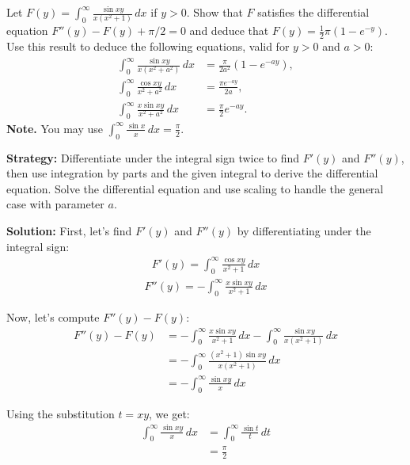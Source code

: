 \begin{problembox}
Let $F(y) = \int_{0}^{\infty} \frac{\sin xy}{x(x^2 + 1)} \, dx$ if $y > 0$. Show that $F$ satisfies the differential equation $F''(y) - F(y) + \pi / 2 = 0$ and deduce that $F(y) = \frac{1}{2} \pi (1 - e^{-y})$. Use this result to deduce the following equations, valid for $y > 0$ and $a > 0$:
\begin{align*}
\int_{0}^{\infty} \frac{\sin xy}{x(x^2 + a^2)} \, dx &= \frac{\pi}{2a^2} (1 - e^{-ay}), \\
\int_{0}^{\infty} \frac{\cos xy}{x^2 + a^2} \, dx &= \frac{\pi e^{-ay}}{2a}, \\
\int_{0}^{\infty} \frac{x \sin xy}{x^2 + a^2} \, dx &= \frac{\pi}{2} e^{-ay}.
\end{align*}
\textbf{Note.} You may use $\int_{0}^{\infty} \frac{\sin x}{x} \, dx = \frac{\pi}{2}.$
\end{problembox}

\noindent\textbf{Strategy:} Differentiate under the integral sign twice to find $F'(y)$ and $F''(y)$, then use integration by parts and the given integral to derive the differential equation. Solve the differential equation and use scaling to handle the general case with parameter $a$.

\bigskip\noindent\textbf{Solution:}
First, let's find $F'(y)$ and $F''(y)$ by differentiating under the integral sign:
\begin{align*}
F'(y) = \int_{0}^{\infty} \frac{\cos xy}{x^2 + 1} \, dx
\end{align*}
\begin{align*}
F''(y) = -\int_{0}^{\infty} \frac{x \sin xy}{x^2 + 1} \, dx
\end{align*}

Now, let's compute $F''(y) - F(y)$:
\begin{align*}
F''(y) - F(y) &= -\int_{0}^{\infty} \frac{x \sin xy}{x^2 + 1} \, dx - \int_{0}^{\infty} \frac{\sin xy}{x(x^2 + 1)} \, dx \\
&= -\int_{0}^{\infty} \frac{(x^2 + 1) \sin xy}{x(x^2 + 1)} \, dx \\
&= -\int_{0}^{\infty} \frac{\sin xy}{x} \, dx
\end{align*}

Using the substitution $t = xy$, we get:
\begin{align*}
\int_{0}^{\infty} \frac{\sin xy}{x} \, dx &= \int_{0}^{\infty} \frac{\sin t}{t} \, dt \\
&= \frac{\pi}{2}
\end{align*}

